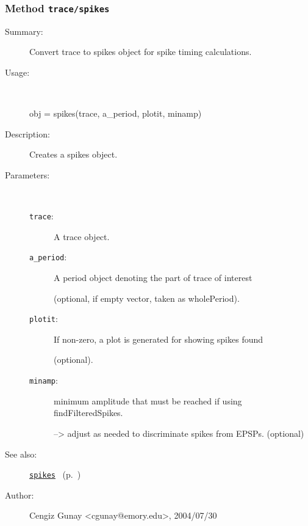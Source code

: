 \subsubsection[Method \texttt{spikes}]{Method \texttt{trace/spikes}}%
%
\label{ref_trace__spikes}%
\hypertarget{ref_trace__spikes}{}%
\begin{description}
\item[Summary:]Convert trace to spikes object for spike timing calculations.
%
\item[Usage:]~%
\begin{lyxcode}%
obj = spikes(trace, a\_period, plotit, minamp)
%
\end{lyxcode}%
%
\item[Description:]%
Creates a spikes object.
\item[Parameters:]~
\begin{description}%
\item[\texttt{trace}:]
 A trace object.
\item[\texttt{a\_period}:]
 A period object denoting the part of trace of interest 

(optional, if empty vector, taken as wholePeriod).
\item[\texttt{plotit}:]
 If non-zero, a plot is generated for showing spikes found

(optional).
\item[\texttt{minamp}:]
 minimum amplitude that must be reached if using findFilteredSpikes.

--> adjust as needed to discriminate spikes from EPSPs.
(optional)
\end{description}%
%
%
%
\item[See also:]%
\hyperlink{ref_spikes}{\texttt{spikes}}%
\ (p.~\pageref{ref_spikes})%
%
%
\item[Author:]%
Cengiz Gunay <cgunay@emory.edu>, 2004/07/30
%
\end{description}
\methodline%
